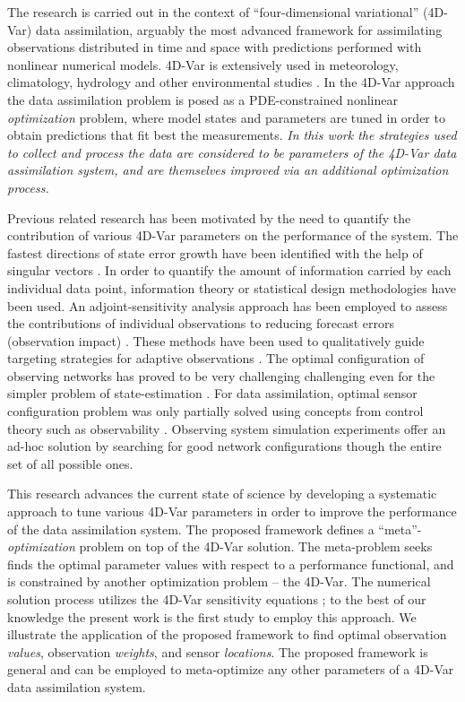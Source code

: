 \documentclass{article}
\begin{document}
The research is carried out in the context of 
``four-dimensional variational'' (4D-Var) data assimilation, arguably the most advanced framework for assimilating observations 
distributed in time and space with predictions performed with nonlinear numerical models.
4D-Var is extensively used in meteorology, climatology, hydrology and other environmental studies \cite{Kalnay,Daley,lewisds,navon2009data,chai2007four}.
In the 4D-Var approach the data assimilation problem is posed as a PDE-constrained nonlinear \textit{optimization} problem,
where model states and parameters are tuned in order to obtain predictions that fit best the measurements.
{\em In this work the strategies used to collect and process the data are considered to be parameters of the 4D-Var data assimilation system,
and are themselves improved via an additional optimization process.} 


Previous related research has been motivated by the need to quantify the contribution of various 4D-Var parameters on the performance of the system.
The fastest directions of state error growth have been identified with the help of singular vectors \cite{Palmer_1999, Sandu_HSV}.
In order to quantify the amount of information carried by each individual data point, 
information theory \cite{ZupInfoTheory,singh2013practical} or statistical design \cite{Berliner_1999} methodologies have been used.
An adjoint-sensitivity analysis approach has been employed to assess the contributions of individual observations to reducing forecast errors (observation impact)  \cite{gelaro2007examination,gelaro2009examination,TELA:TELA349}.
These methods have been used to qualitatively guide targeting strategies for adaptive observations \cite{baker2000observation,daescu2004adaptive}.
The optimal configuration of observing networks has proved to be very challenging challenging even for the simpler problem of state-estimation \cite{ucinski2000optimal}.
For data assimilation, optimal sensor configuration problem was only partially solved using concepts from control theory such as observability \cite{TELLUSA17133}.
Observing system simulation experiments \cite{wang2008hybrid,atlas1997atmospheric} offer an ad-hoc solution by searching for good network configurations though the entire set of all possible ones.
 
This research advances the current state of science by developing  a systematic approach to tune various 4D-Var parameters
in order to improve the performance of the data assimilation system.
The proposed framework defines a ``meta''-\textit{optimization} problem on top of the 4D-Var solution.
The meta-problem seeks finds the optimal parameter values with respect to a performance functional,
and is constrained by another optimization problem -- the 4D-Var.  The numerical solution process utilizes the
4D-Var sensitivity equations \cite{LeDimet_1997,Daescu_2008,Daescu_2010}; to the best of our knowledge the present work is
the first study to employ this approach. We illustrate the application of the proposed framework
to find optimal observation \textit{values}, observation \textit{weights}, and sensor \textit{locations}.
The proposed framework is general and can be employed to meta-optimize any other parameters of a 4D-Var
data assimilation system. 
  
\end{document}
